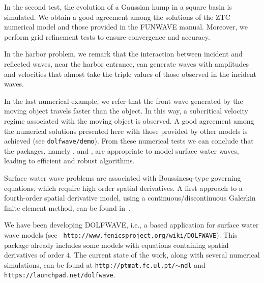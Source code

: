  In the second test, the evolution of a Gaussian hump in a
square basin is simulated.  We obtain a good agreement among
the solutions of the ZTC numerical model and those provided
in the FUNWAVE manual.  Moreover, we perform grid refinement
tests to ensure convergence and accuracy.


In the harbor problem, we
remark that the interaction between incident and reflected
waves, near the harbor entrance, can generate waves with
amplitudes and velocities that almost take the triple values
of those observed in the incident waves.

In the last
numerical example, we refer that the front wave generated by the
moving object travels faster than the object.  In this way,
a subcritical velocity regime associated with the moving
object is observed.  A good agreement among the numerical
solutions presented here with those provided by other models
is achieved (see {\tt dolfwave/demo}).  From these numerical
tests we can conclude that the \fenics packages,
namely \dolfin, \ufl and \ffc, are appropriate to model
surface water waves, leading to efficient and robust
algorithms.

Surface water wave problems are associated with
Boussinesq-type governing equations, which require high
order spatial derivatives. A first approach to a
fourth-order spatial derivative model, using a
continuous/discontinuous Galerkin finite element method, can
be found in~\cite{LopesPereiraTrabucho}.

We have been developing DOLFWAVE, i.e., a \fenics based
application for surface water wave models (see {\tt
http://www.fenicsproject.org/wiki/DOLFWAVE}).  This package
already includes some models with equations containing
spatial derivatives of order $4$.  The current state of the
work, along with several nume\-ri\-cal simulations, can be found
at {\tt http://ptmat.fc.ul.pt/$\sim$ndl} and {\tt
https://launchpad.net/dolfwave}.

